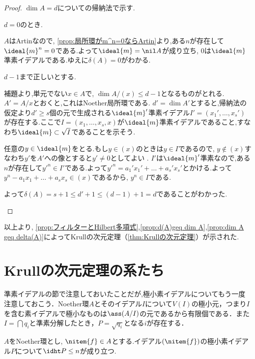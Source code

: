 \begin{proof}
	$\dim A=d$についての帰納法で示す.
	
	\begin{step}
		\item $d=0$のとき.
		
		$A$はArtinなので, \ref{prop:局所環がm^n=0ならArtin}より,ある$n$が存在して$\ideal{m}^n=0$である.よって$\ideal{m}=\nil A$が成り立ち, $0$は$\ideal{m}$準素イデアルである.ゆえに$\delta(A)=0$がわかる.
		
		\item $d-1$まで正しいとする.
		
		補題より,単元でない$x\in A$で, $\dim A/(x)\leq d-1$となるものがとれる. $A'=A/x$とおくと,これはNoether局所環である. $d'=\dim A'$とすると,帰納法の仮定より$d'\geq s$個の元で生成される$\ideal{m}'$準素イデアル$I'=(x_1',\dots,x_s')$が存在する.ここで$I=(x_1,\dots,x_s,x)$が$\ideal{m}$準素イデアルであること,すなわち$\ideal{m}\subset\sqrt{I}$であることを示そう.
		
		任意の$y\in\ideal{m}$をとる.もし$y\in (x)$のときは$y\in I$であるので, $y\not\in(x)$すなわち$y'$を$A'$への像とすると$y'\neq0$としてよい	. $I'$は$\ideal{m}'$準素なので,ある$n$が存在して$y'^n\in I'$である.よって$y'^n=a_1'x_1'+\dots+a_s'x_s'$とかける.よって$y^n-a_1x_1+\dots+a_sx_s\in (x)$であるから, $y^n\in I$である.
		
		よって$\delta(A)=s+1\leq d'+1\leq (d-1)+1=d$であることがわかった.
	\end{step}
\end{proof}

以上より, \ref{prop:フィルターとHilbert多項式},\ref{prop:d(A)geq dim A},\ref{prop:dim A geq delta(A)}によってKrullの次元定理（\ref{thm:Krullの次元定理}）が示された.

\section{Krullの次元定理の系たち}

準素イデアルの節で注意しておいたことだが,極小素イデアルについてもう一度注意しておこう．Noether環$A$とそのイデアル$I$について$V(I)$の極小元，つまり$I$を含む素イデアルで極小なものは$\ass(A/I)$の元であるから有限個である．また$I=\bigcap q_i$と準素分解したとき，$P=\sqrt{q_i}$となる$i$が存在する．
\begin{thm}[Krullの標高定理]
	$A$をNoether環とし, $\nitem{f}\in A$とする.イデアル$(\nitem{f})$の極小素イデアル$P$について$\idht P\leq n$が成り立つ.
\end{thm}

